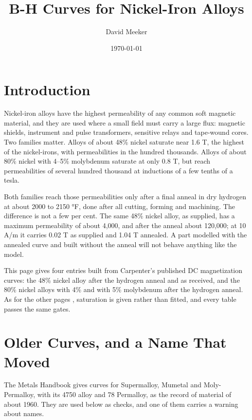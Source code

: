 \documentclass[
  11pt,
]{article}
\title{B-H Curves for Nickel-Iron Alloys}
\author{David Meeker}
\date{\today}
\begin{document}
\maketitle

\section{Introduction}\label{introduction}

Nickel-iron alloys have the highest permeability of any common soft magnetic material, and they are used where a small field must carry a large flux: magnetic shields, instrument and pulse transformers, sensitive relays and tape-wound cores. Two families matter. Alloys of about 48\% nickel saturate near 1.6 T, the highest of the nickel-irons, with permeabilities in the hundred thousands. Alloys of about 80\% nickel with 4--5\% molybdenum saturate at only 0.8 T, but reach permeabilities of several hundred thousand at inductions of a few tenths of a tesla.

Both families reach those permeabilities only after a final anneal in dry hydrogen at about 2000 to 2150 °F, done after all cutting, forming and machining. The difference is not a few per cent. The same 48\% nickel alloy, as supplied, has a maximum permeability of about 4,000, and after the anneal about 120,000; at 10 A/m it carries 0.02 T as supplied and 1.04 T annealed. A part modelled with the annealed curve and built without the anneal will not behave anything like the model.

This page gives four entries built from Carpenter's published DC magnetization curves: the 48\% nickel alloy after the hydrogen anneal and as received, and the 80\% nickel alloys with 4\% and with 5\% molybdenum after the hydrogen anneal. As for the other pages \cite{meeker-lowcarbon,meeker-iron,meeker-cofe}, saturation is given rather than fitted, and every table passes the same gates.

\section{Older Curves, and a Name That Moved}\label{older-curves}

The Metals Handbook \cite{mh8} gives curves for Supermalloy, Mumetal and Moly-Permalloy, with its 4750 alloy and 78 Permalloy, as the record of material of about 1960. They are used below as checks, and one of them carries a warning about names.
\end{document}
